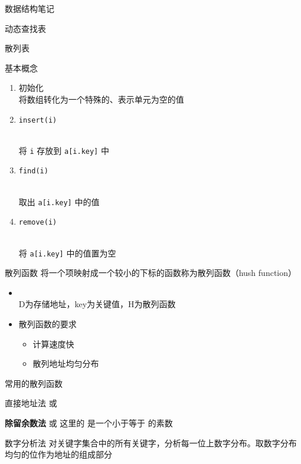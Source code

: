 \documentclass[
  ignorenonframetext,
]{beamer}
\providecommand{\tightlist}{%
  \setlength{\itemsep}{0pt}\setlength{\parskip}{0pt}}
\begin{document}
\begin{frame}[fragile]{数据结构笔记}
\begin{block}{动态查找表}
\begin{block}{散列表}
\begin{block}{基本概念}
\protect{}\label{ux57faux672cux6982ux5ff5}
\begin{enumerate}
\tightlist
\item
  初始化\\
  将数组转化为一个特殊的、表示单元为空的值
\item
  \texttt{insert(i)}\strut \\
  将 \texttt{i} 存放到 \texttt{a{[}i.key{]}} 中
\item
  \texttt{find(i)}\strut \\
  取出 \texttt{a{[}i.key{]}} 中的值
\item
  \texttt{remove(i)}\strut \\
  将 \texttt{a{[}i.key{]}} 中的值置为空
\end{enumerate}
\end{block}

\begin{block}{散列函数}
\protect{}\label{ux6563ux5217ux51fdux6570}
将一个项映射成一个较小的下标的函数称为散列函数（hush function）

\begin{itemize}
\tightlist
\item
  {}\strut \\
  D为存储地址，key为关键值，H为散列函数
\item
  散列函数的要求

  \begin{itemize}
  \tightlist
  \item
    计算速度快
  \item
    散列地址均匀分布
  \end{itemize}
\end{itemize}
\end{block}

\begin{block}{常用的散列函数}
\protect{}\label{ux5e38ux7528ux7684ux6563ux5217ux51fdux6570}
\begin{block}{直接地址法}
\protect{}\label{ux76f4ux63a5ux5730ux5740ux6cd5}
{} 或 {}
\end{block}

\begin{block}{\textbf{除留余数法}}
\protect{}\label{ux9664ux7559ux4f59ux6570ux6cd5}
{} 或 {} 这里的 {} 是一个小于等于 {} 的素数
\end{block}

\begin{block}{数字分析法}
\protect{}\label{ux6570ux5b57ux5206ux6790ux6cd5}
对关键字集合中的所有关键字，分析每一位上数字分布。取数字分布均匀的位作为地址的组成部分
\end{block}


\end{block}
\end{block}
\end{block}
\end{frame}
\end{document}
